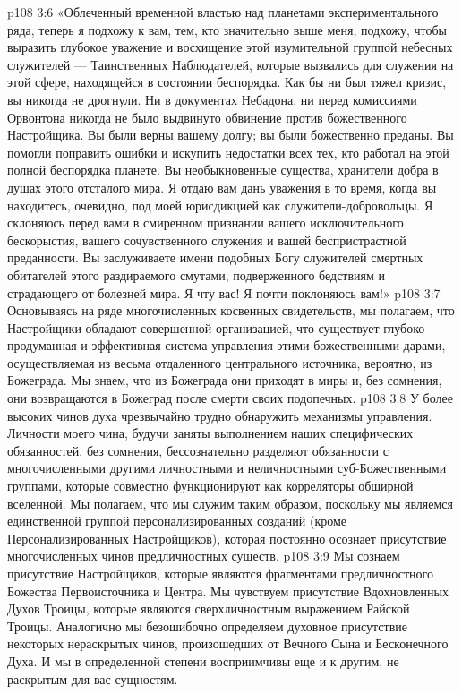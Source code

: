 \vs p108 3:6 «Облеченный временной властью над планетами экспериментального ряда, теперь я подхожу к вам, тем, кто значительно выше меня, подхожу, чтобы выразить глубокое уважение и восхищение этой изумительной группой небесных служителей --- Таинственных Наблюдателей, которые вызвались для служения на этой сфере, находящейся в состоянии беспорядка. Как бы ни был тяжел кризис, вы никогда не дрогнули. Ни в документах Небадона, ни перед комиссиями Орвонтона никогда не было выдвинуто обвинение против божественного Настройщика. Вы были верны вашему долгу; вы были божественно преданы. Вы помогли поправить ошибки и искупить недостатки всех тех, кто работал на этой полной беспорядка планете. Вы необыкновенные существа, хранители добра в душах этого отсталого мира. Я отдаю вам дань уважения в то время, когда вы находитесь, очевидно, под моей юрисдикцией как служители\hyp{}добровольцы. Я склоняюсь перед вами в смиренном признании вашего исключительного бескорыстия, вашего сочувственного служения и вашей беспристрастной преданности. Вы заслуживаете имени подобных Богу служителей смертных обитателей этого раздираемого смутами, подверженного бедствиям и страдающего от болезней мира. Я чту вас! Я почти поклоняюсь вам!»
\vs p108 3:7 \pc Основываясь на ряде многочисленных косвенных свидетельств, мы полагаем, что Настройщики обладают совершенной организацией, что существует глубоко продуманная и эффективная система управления этими божественными дарами, осуществляемая из весьма отдаленного центрального источника, вероятно, из Божеграда. Мы знаем, что из Божеграда они приходят в миры и, без сомнения, они возвращаются в Божеград после смерти своих подопечных.
\vs p108 3:8 У более высоких чинов духа чрезвычайно трудно обнаружить механизмы управления. Личности моего чина, будучи заняты выполнением наших специфических обязанностей, без сомнения, бессознательно разделяют обязанности с многочисленными другими личностными и неличностными суб\hyp{}Божественными группами, которые совместно функционируют как корреляторы обширной вселенной. Мы полагаем, что мы служим таким образом, поскольку мы являемся единственной группой персонализированных созданий (кроме Персонализированных Настройщиков), которая постоянно осознает присутствие многочисленных чинов предличностных существ.
\vs p108 3:9 Мы сознаем присутствие Настройщиков, которые являются фрагментами предличностного Божества Первоисточника и Центра. Мы чувствуем присутствие Вдохновленных Духов Троицы, которые являются сверхличностным выражением Райской Троицы. Аналогично мы безошибочно определяем духовное присутствие некоторых нераскрытых чинов, произошедших от Вечного Сына и Бесконечного Духа. И мы в определенной степени восприимчивы еще и к другим, не раскрытым для вас сущностям.
